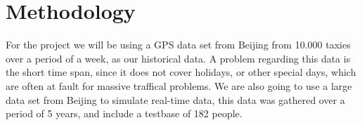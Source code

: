 \section{Methodology}
For the project we will be using a GPS data set from Beijing from 10.000 taxies over a period of a week, as our historical data. A problem regarding this data is the short time span, since it does not cover holidays, or other special days, which are often at fault for massive traffical problems. We are also going to use a large data set from Beijing to simulate real-time data, this data was gathered over a period of 5 years, and include a testbase of 182 people.